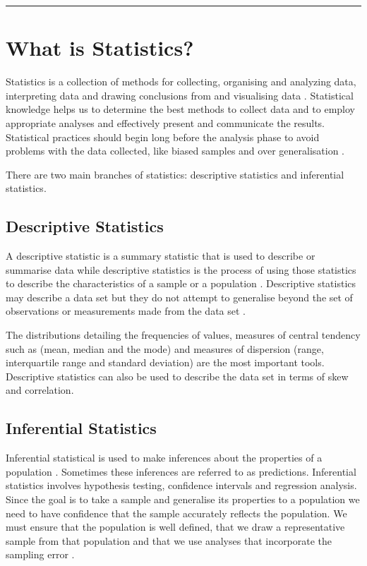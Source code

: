 \documentclass[
]{book}
\begin{document}
\begin{center}\rule{0.5\linewidth}{0.5pt}\end{center}

\hypertarget{what-is-statistics}{%
\section{What is Statistics?}\label{what-is-statistics}}

Statistics is a collection of methods for collecting, organising and analyzing data, interpreting data and drawing conclusions from and visualising data \citep{Witte2017}. Statistical knowledge helps us to determine the best methods to collect data and to employ appropriate analyses and effectively present and communicate the results. Statistical practices should begin long before the analysis phase to avoid problems with the data collected, like biased samples and over generalisation \citep{Frost2019}.

There are two main branches of statistics: descriptive statistics and inferential statistics.

\hypertarget{descriptive-statistics}{%
\subsection{Descriptive Statistics}\label{descriptive-statistics}}

A descriptive statistic is a summary statistic that is used to describe or summarise data while descriptive statistics is the process of using those statistics to describe the characteristics of a sample or a population \citep{Witte2017}. Descriptive statistics may describe a data set but they do not attempt to generalise beyond the set of observations or measurements made from the data set \citep{Frost2019}.

The distributions detailing the frequencies of values, measures of central tendency such as (mean, median and the mode) and measures of dispersion (range, interquartile range and standard deviation) are the most important tools. Descriptive statistics can also be used to describe the data set in terms of skew and correlation.

\hypertarget{inferential-statistics}{%
\subsection{Inferential Statistics}\label{inferential-statistics}}

Inferential statistical is used to make inferences about the properties of a population \citep{Witte2017}. Sometimes these inferences are referred to as predictions. Inferential statistics involves hypothesis testing, confidence intervals and regression analysis. Since the goal is to take a sample and generalise its properties to a population we need to have confidence that the sample accurately reflects the population. We must ensure that the population is well defined, that we draw a representative sample from that population and that we use analyses that incorporate the sampling error \citep{Frost2019}.
\end{document}
